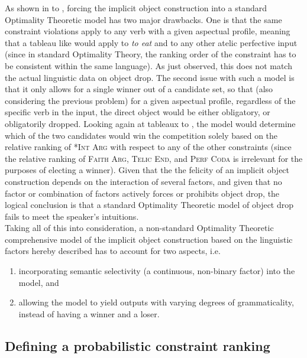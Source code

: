 As shown in  to , forcing the implicit object construction into a standard Optimality Theoretic model has two major drawbacks. One is that the same constraint violations apply to any verb with a given aspectual profile, meaning that a tableau like  would apply to \textit{to eat} and to any other atelic perfective input (since in standard Optimality Theory, the ranking order of the constraint has to be consistent within the same language). As just observed, this does not match the actual linguistic data on object drop. The second issue with such a model is that it only allows for a single winner out of a candidate set, so that (also considering the previous problem) for a given aspectual profile, regardless of the specific verb in the input, the direct object would be either obligatory, or obligatorily dropped. Looking again at tableaux  to , the model would determine which of the two candidates would win the competition solely based on the relative ranking of \textsc{*Int Arg} with respect to any of the other constraints (since the relative ranking of \textsc{Faith Arg}, \textsc{Telic End}, and \textsc{Perf Coda} is irrelevant for the purposes of electing a winner). Given that the the felicity of an implicit object construction depends on the interaction of several factors, and given that no factor or combination of factors actively forces or prohibits object drop, the logical conclusion is that a standard Optimality Theoretic model of object drop fails to meet the speaker's intuitions.\\
Taking all of this into consideration, a non-standard Optimality Theoretic comprehensive model of the implicit object construction based on the linguistic factors hereby described has to account for two aspects, i.e.
\begin{enumerate}
    \item incorporating semantic selectivity (a continuous, non-binary factor) into the model, and
    \item allowing the model to yield outputs with varying degrees of grammaticality, instead of having a winner and a loser.
\end{enumerate}

\subsection{Defining a probabilistic constraint ranking} 
